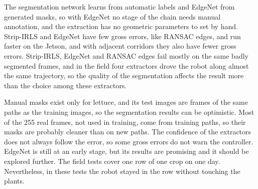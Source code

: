 \documentclass[10pt,a4paper]{article}
\begin{document}
The segmentation network learns from automatic labels and EdgeNet from generated masks, so with EdgeNet no stage of the chain needs manual annotation, and the extraction has no geometric parameters to set by hand. Strip-IRLS and EdgeNet have few gross errors, like RANSAC edges, and run faster on the Jetson, and with adjacent corridors they also have fewer gross errors. Strip-IRLS, EdgeNet and RANSAC edges fail mostly on the same badly segmented frames, and in the field four extractors drove the robot along almost the same trajectory, so the quality of the segmentation affects the result more than the choice among these extractors.

Manual masks exist only for lettuce, and its test images are frames of the same paths as the training images, so the segmentation results can be optimistic. Most of the 255 real frames, not used in training, come from training paths, so their masks are probably cleaner than on new paths. The confidence of the extractors does not always follow the error, so some gross errors do not warn the controller. EdgeNet is still at an early stage, but its results are promising and it should be explored further. The field tests cover one row of one crop on one day. Nevertheless, in these tests the robot stayed in the row without touching the plants.
\end{document}
